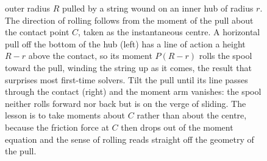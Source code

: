 \begin{figure}[htbp]
{outer radius $R$ pulled by a string wound on an inner hub of radius $r$.
The direction of rolling follows from the moment of the pull about the
contact point $C$, taken as the instantaneous centre. A horizontal pull
off the bottom of the hub (left) has a line of action a height $R-r$
above the contact, so its moment $P(R-r)$ rolls the spool toward the
pull, winding the string up as it comes, the result that surprises most
first-time solvers. Tilt the pull until its line passes through the
contact (right) and the moment arm vanishes: the spool neither rolls
forward nor back but is on the verge of sliding. The lesson is to take
moments about $C$ rather than about the centre, because the friction
force at $C$ then drops out of the moment equation and the sense of
rolling reads straight off the geometry of the pull.}
\label{fig:vol03ch04:pulled-spool}
\end{figure}

